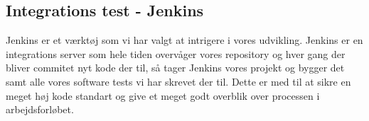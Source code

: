 \subsection*{Integrations test - Jenkins}
Jenkins er et værktøj som vi har valgt at intrigere i vores udvikling. Jenkins er en integrations server som hele tiden overvåger vores repository og hver gang der bliver commitet nyt kode der til, så tager Jenkins vores projekt og bygger det samt alle vores software tests vi har skrevet der til. Dette er med til at sikre en meget høj kode standart og give et meget godt overblik over processen i arbejdsforløbet.  